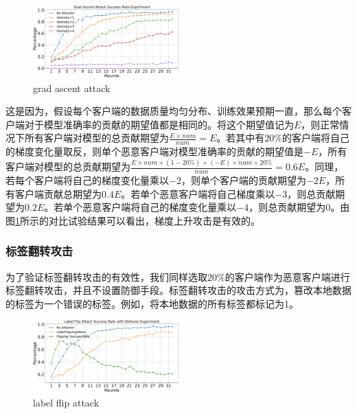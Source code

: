 \documentclass[conference]{IEEEtran}
\def\figGradAscentAttack{0.5\textwidth}
\def\figLabelFlip{0.5\textwidth}
\begin{document}
\begin{figure}[htbp]
    \centerline{\includegraphics[width=\figGradAscentAttack]{pics/001-gradAttack-attackRate.pdf}}
    \caption{grad ascent attack}
    \label{fig:gradAscent}
\end{figure}

这是因为，假设每个客户端的数据质量均匀分布、训练效果预期一直，那么每个客户端对于模型准确率的贡献的期望值都是相同的。将这个期望值记为$E$，则正常情况下所有客户端对模型的总贡献期望为$\frac{E\times num}{num}=E$。若其中有$20\%$的客户端将自己的梯度变化量取反，则单个恶意客户端对模型准确率的贡献的期望值是$-E$，所有客户端对模型的总贡献期望为$\frac{E\times num\times(1-20\%)+(-E)\times num\times 20\%}{num} = 0.6E$。同理，若每个客户端将自己的梯度变化量乘以$-2$，则单个客户端的贡献期望为$-2E$，所有客户端贡献总期望为$0.4E$。若单个恶意客户端将自己梯度乘以$-3$，则总贡献期望为$0.2E$。若单个恶意客户端将自己的梯度变化量乘以$-4$，则总贡献期望为$0$。由图\hyperref[fig:gradAscent]{\ref{fig:gradAscent}}所示的对比试验结果可以看出，梯度上升攻击是有效的。

\subsubsection{\textbf{标签翻转攻击}}
\label{exp:attack:label}

为了验证标签翻转攻击的有效性，我们同样选取$20\%$的客户端作为恶意客户端进行标签翻转攻击，并且不设置防御手段。标签翻转攻击的攻击方式为，篡改本地数据的标签为一个错误的标签。例如，将本地数据的所有标签都标记为1。

\begin{figure}[htbp]
    \centerline{\includegraphics[width=\figLabelFlip]{pics/002-LabelFlippingAttack-attackRate.pdf}}
    \caption{label flip attack}
    \label{fig:labelFlip}
\end{figure}
\end{document}
